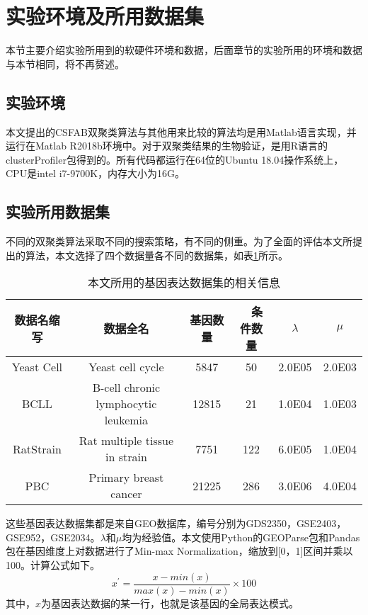 \section{实验环境及所用数据集}
本节主要介绍实验所用到的软硬件环境和数据，后面章节的实验所用的环境和数据与本节相同，将不再赘述。
    \subsection{实验环境}
    本文提出的CSFAB双聚类算法与其他用来比较的算法均是用Matlab语言实现，并运行在Matlab R2018b环境中。对于双聚类结果的生物验证，是用R语言的clusterProfiler包得到的。所有代码都运行在64位的Ubuntu 18.04操作系统上，CPU是intel i7-9700K，内存大小为16G。

    \subsection{实验所用数据集}
    不同的双聚类算法采取不同的搜索策略，有不同的侧重。为了全面的评估本文所提出的算法，本文选择了四个数据量各不同的数据集，如表\ref{tab:data}所示。
    \begin{table}[htbp]
    \caption{本文所用的基因表达数据集的相关信息}\label{tab:data}
    \vspace{0.5em}\centering\wuhao
    \begin{tabular}{cccccc}
    \toprule[1.5pt]
    数据名缩写 & 数据全名 & 基因数量 &　条件数量 & $\lambda$& $\mu$ \\
    \midrule[1pt]
    Yeast Cell & Yeast cell cycle & 5847& 50 & 2.0E05 &  2.0E03\\
    BCLL & B-cell chronic lymphocytic leukemia& 12815& 21 & 1.0E04 & 1.0E03\\
    RatStrain & Rat multiple tissue in strain& 7751& 122 & 6.0E05 & 1.0E04\\
    PBC & Primary breast cancer& 21225& 286 & 3.0E06 & 4.0E04\\
    \bottomrule[1.5pt]
    \end{tabular}
    \end{table}
    这些基因表达数据集都是来自GEO数据库，编号分别为GDS2350，GSE2403，GSE952，GSE2034。$\lambda$和$\mu$均为经验值。本文使用Python的GEOParse包和Pandas包在基因维度上对数据进行了Min-max Normalization，缩放到[0，1]区间并乘以100。计算公式如下。
    \begin{equation}
        x^{\prime} = \frac{x - min(x)}{max(x) - min(x)} \times 100
    \end{equation}
    其中，$x$为基因表达数据的某一行，也就是该基因的全局表达模式。

